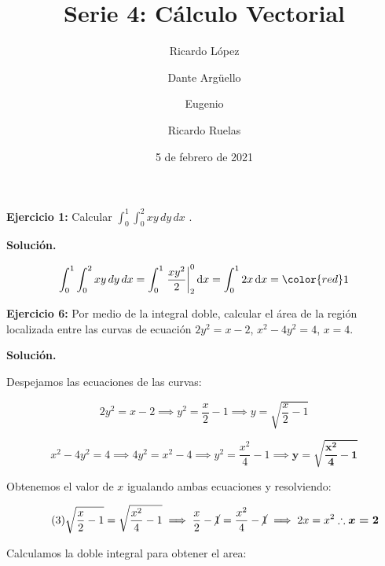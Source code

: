 \documentclass[12pt]{article}
\date{5 de febrero de 2021}
\title{Serie 4: Cálculo Vectorial}
\author{Ricardo López \and Dante Argüello \and Eugenio \and Ricardo Ruelas}
\DeclareMathOperator{\di}{d\!}
\begin{document}
	
\maketitle
	
\newcommand{\Int}{\int\limits}

\newcommand*\eval[3]{\left.#1\right\rvert_{#2}^{#3}}

\noindent \textbf{Ejercicio 1:} Calcular $\int_0^1 \int_0^2 xy \,dy\,dx$ .

\vspace{5mm}

\noindent \textbf{Solución.}
 
\vspace{5mm}

\begin{align*}
\int_0^1 \int_0^2 xy \,dy\,dx = \int_0^1 \eval{\frac{xy^2}{2}}{2}{0} \di x 
= \int_0^1 2x \di x 
= \color {red} 1
\end{align*}



\noindent \textbf{Ejercicio 6:} Por medio de la integral doble, calcular el área de la región localizada entre las curvas de ecuación $2y^2=x-2$, $x^2-4y^2=4$, $x=4$.

\vspace{5mm}

\noindent \textbf{Solución.}

\vspace{5mm}

\noindent Despejamos las ecuaciones de las curvas:

\begin{equation}\tag{1}
	2y^2 = x-2 \implies y^2 = \frac{x}{2}-1 \implies y = \sqrt{\frac{x}{2}-1}
\end{equation}

\begin{equation}\tag{2}
	x^2-4y^2=4 \implies 4y^2=x^2-4 \implies y^2=\frac{x^2}{4}-1 \implies \boldsymbol{y=\sqrt{\frac{x^2}{4}-1}} 
\end{equation}

\noindent Obtenemos el valor de $x$ igualando ambas ecuaciones y resolviendo:

\begin{equation}\tag{3}
	\sqrt{\frac{x}{2}-1}=\sqrt{\frac{x^2}{4}-1} \implies \frac{x}{2}-\cancel{1}=\frac{x^2}{4}-\cancel{1} \implies 2x = x^2 \therefore \boldsymbol{x=2}
\end{equation}

\noindent Calculamos la doble integral para obtener el area:
\end{document}
